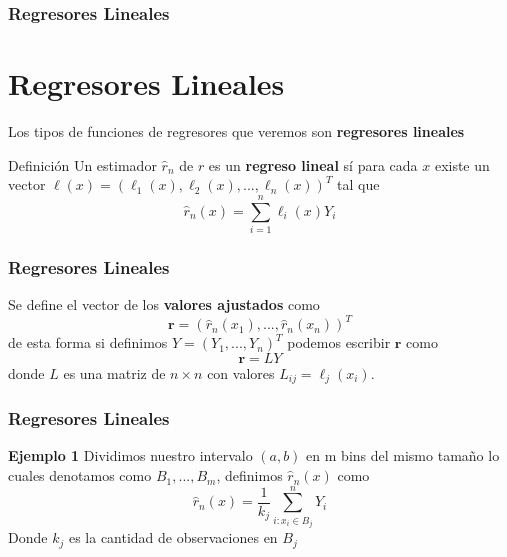\documentclass[aspectratio=169,spanish]{beamer}
\begin{document}
\begin{frame}
\frametitle{Regresores Lineales}
\section{Regresores Lineales}
Los tipos de funciones de regresores que veremos son \textbf{regresores lineales}
\begin{block}{Definición}
Un estimador $\hat{r}_n$ de $r$ es un \textbf{regreso lineal} sí para cada $x$ existe un vector $\ell(x)=(\ell_1(x),\ell_2(x),...,\ell_n(x))^{T}$ tal que $$\hat{r}_n(x)=\sum_{i=1}^{n}\ell_i(x)Y_i$$

\end{block}
\end{frame}
\begin{frame}
\frametitle{Regresores Lineales}
Se define el vector de los \textbf{valores ajustados} como $$\textbf{r}=(\hat{r}_n(x_1),...,\hat{r}_n(x_n))^{T}$$
de esta forma si definimos $Y=(Y_1,...,Y_n)^{T}$ podemos escribir $\textbf{r}$ como 
$$\textbf{r} = LY$$
donde $L$ es una matriz de $n\times n$ con valores $L_{ij}=\ell_j(x_i)$.
\end{frame}

\begin{frame}
\frametitle{Regresores Lineales}

\textbf{Ejemplo 1 }
Dividimos nuestro intervalo $(a,b)$ en m bins del mismo tamaño lo cuales denotamos como $B_1,...,B_m$, definimos $\hat{r}_n(x)$ como 
$$\hat{r}_n(x)=\frac{1}{k_j}\sum_{i:x_i\in B_j}^{n}Y_i$$
Donde $k_j$ es la cantidad de observaciones en $B_j$
\end{frame}
\end{document}
